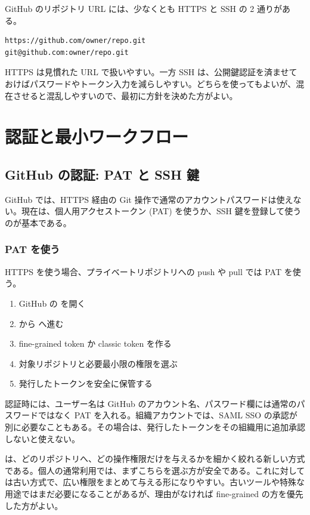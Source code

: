GitHub のリポジトリ URL には、少なくとも HTTPS と SSH の 2 通りがある。

\begin{lstlisting}[numbers=none, xleftmargin=2\zw]
https://github.com/owner/repo.git
git@github.com:owner/repo.git
\end{lstlisting}

HTTPS は見慣れた URL で扱いやすい。一方 SSH は、公開鍵認証を済ませておけばパスワードやトークン入力を減らしやすい。どちらを使ってもよいが、混在させると混乱しやすいので、最初に方針を決めた方がよい。

\section{認証と最小ワークフロー}

\subsection{GitHub の認証: PAT と SSH 鍵}

GitHub では、HTTPS 経由の Git 操作で通常のアカウントパスワードは使えない。現在は、個人用アクセストークン (PAT) を使うか、SSH 鍵を登録して使うのが基本である。

\subsubsection{PAT を使う}

HTTPS を使う場合、プライベートリポジトリへの push や pull では PAT を使う。

\begin{enumerate}
\item GitHub の  を開く
\item {} から  へ進む
\item fine-grained token か classic token を作る
\item 対象リポジトリと必要最小限の権限を選ぶ
\item 発行したトークンを安全に保管する
\end{enumerate}

認証時には、ユーザー名は GitHub のアカウント名、パスワード欄には通常のパスワードではなく PAT を入れる。組織アカウントでは、SAML SSO の承認が別に必要なこともある。その場合は、発行したトークンをその組織用に追加承認しないと使えない。

 は、どのリポジトリへ、どの操作権限だけを与えるかを細かく絞れる新しい方式である。個人の通常利用では、まずこちらを選ぶ方が安全である。これに対して  は古い方式で、広い権限をまとめて与える形になりやすい。古いツールや特殊な用途ではまだ必要になることがあるが、理由がなければ fine-grained の方を優先した方がよい。

